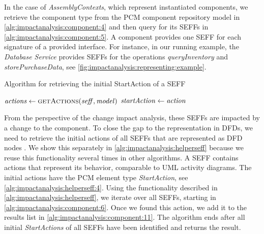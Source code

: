 In the case of \emph{AssemblyContexts}, which represent instantiated components, we retrieve the component type from the \ac{PCM} component repository model in \autoref{alg:impactanalysis:component:4} and then query for its \acp{SEFF} in \autoref{alg:impactanalysis:component:5}.
A component provides one \ac{SEFF} for each signature of a provided interface.
For instance, in our running example, the \emph{Database Service} provides \acp{SEFF} for the operations \emph{queryInventory} and \emph{storePurchaseData}, see \autoref{fig:impactanalysis:representing:example}.

\begin{algorithm}
    \caption{Algorithm for retrieving the initial StartAction of a \ac*{SEFF}}
    \label{alg:impactanalysis:helperseff}
    \begin{algorithmic}[1]
            \algindentskip
            \State $\mathit{actions} \gets \textsc{getActions}(\mathit{seff}, \mathit{model})$
                 \label{alg:impactanalysis:helperseff:4}
                    \State $\mathit{startAction} \gets \mathit{action}$ 
                    \State {}
                \EndIf
            \EndFor
            \algindentskip
        \EndProcedure   
    \end{algorithmic}
\end{algorithm}

From the perspective of the change impact analysis, these \acp{SEFF} are impacted by a change to the component.
To close the gap to the representation in \acp{DFD}, we need to retrieve the initial actions of all \acp{SEFF} that are represented as \ac{DFD} nodes \cite{seifermann_architectural_2022}.
We show this separately in \autoref{alg:impactanalysis:helperseff} because we reuse this functionality several times in other algorithms.
A \ac{SEFF} contains actions that represent its behavior, comparable to \ac{UML} activity diagrams.
The initial actions have the \ac{PCM} element type \emph{StartAction}, see \autoref{alg:impactanalysis:helperseff:4}.
Using the functionality described in \autoref{alg:impactanalysis:helperseff}, we iterate over all \acp{SEFF}, starting in \autoref{alg:impactanalysis:component:6}.
Once we found this action, we add it to the results list in \autoref{alg:impactanalysis:component:11}.
The algorithm ends after all initial \emph{StartActions} of all \acp{SEFF} have been identified and returns the result.

